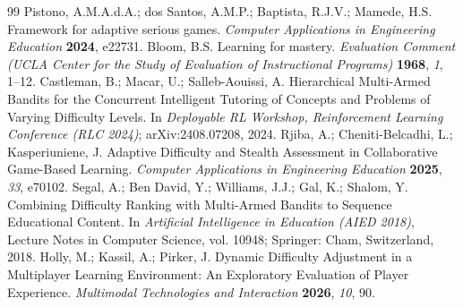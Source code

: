 \documentclass[11pt]{article}
\begin{document}
\begin{thebibliography}{99}
 Pistono, A.M.A.d.A.; dos Santos, A.M.P.; Baptista, R.J.V.; Mamede, H.S. Framework for adaptive serious games. \textit{Computer Applications in Engineering Education} \textbf{2024}, e22731.
 Bloom, B.S. Learning for mastery. \textit{Evaluation Comment (UCLA Center for the Study of Evaluation of Instructional Programs)} \textbf{1968}, \textit{1}, 1--12.
 Castleman, B.; Macar, U.; Salleb-Aouissi, A. Hierarchical Multi-Armed Bandits for the Concurrent Intelligent Tutoring of Concepts and Problems of Varying Difficulty Levels. In \textit{Deployable RL Workshop, Reinforcement Learning Conference (RLC 2024)}; arXiv:2408.07208, 2024.
 Rjiba, A.; Cheniti-Belcadhi, L.; Kasperiuniene, J. Adaptive Difficulty and Stealth Assessment in Collaborative Game-Based Learning. \textit{Computer Applications in Engineering Education} \textbf{2025}, \textit{33}, e70102.
 Segal, A.; Ben David, Y.; Williams, J.J.; Gal, K.; Shalom, Y. Combining Difficulty Ranking with Multi-Armed Bandits to Sequence Educational Content. In \textit{Artificial Intelligence in Education (AIED 2018)}, Lecture Notes in Computer Science, vol. 10948; Springer: Cham, Switzerland, 2018.
 Holly, M.; Kassil, A.; Pirker, J. Dynamic Difficulty Adjustment in a Multiplayer Learning Environment: An Exploratory Evaluation of Player Experience. \textit{Multimodal Technologies and Interaction} \textbf{2026}, \textit{10}, 90.

\end{thebibliography}
\end{document}
